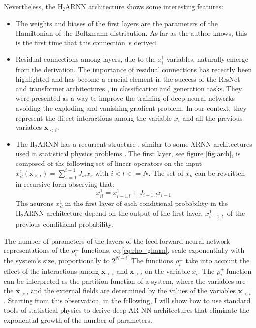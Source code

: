 \documentclass[aps,physrev,10pt,floatfix,reprint]{revtex4-2}
\begin{document}
Nevertheless, the $\text{H}_2\text{ARNN}$ architecture shows some interesting features:
\begin{itemize}
    \item 
    The weights and biases of the first layers are the parameters of the Hamiltonian of the Boltzmann distribution. 
    As far as the author knows, this is the first time that this connection is derived.
    \item Residual connections among layers, due to the $x_i^1$ variables, naturally emerge from the derivation. 
    The importance of residual connections has recently been highlighted  \cite{10.48550/arxiv.1512.03385} and has become a crucial element in the success of the ResNet and transformer architectures \cite{vaswani2017attention}, in classification and generation tasks. They were presented as a way to improve the training of deep neural networks avoiding the exploding and vanishing gradient problem. In our context, they represent the direct interactions among the variable $x_i$ and all the previous variables $\mathbf{x}_{<i}$. 

    \item The $\text{H}_2\text{ARNN}$ has a recurrent structure  \cite{bengioNatureDeepLearning2015, https://doi.org/10.48550/arxiv.1506.00019}, similar to some ARNN architectures used in statistical physics problems \cite{10.1038/s42256-021-00401-3, PhysRevResearch.2.023358}. 
    The first layer, see figure \ref{fig:arch}, is composed of the following set of linear operators on the input $x^1_{il}(\mathbf{x}_{<i})=\sum_{s=1}^{i-1} J_{si} x_s$ with $i<l<=N$. The set of $x_{il}$ can be rewritten in recursive form observing that:
    \begin{equation}
        x^1_{il} = x^1_{i-1,l} + J_{i-1,l} x_{i-1}
    \end{equation}
    The neurons $x^1_{il}$ in the first layer of each conditional probability in the $\text{H}_2\text{ARNN}$ architecture depend on the output of the first layer, $x^1_{i-1,l}$, of the previous conditional probability.
\end{itemize}
The number of parameters of the layers of the feed-forward neural network representations of the $\rho_i^{\pm}$ functions, eq.\ref{eq:rho_ghann}, scale exponentially with the system's size, proportionally to $2^{N-i}$. 
The functions $\rho_i^{\pm}$ take into account the effect of the interactions among $\mathbf{x}_{<i}$ and $\mathbf{x}_{>i}$ on the variable $x_i$. 
The $\rho_i^{\pm}$ function can be interpreted as the partition function of a system, where the variables are the $\mathbf{x}_{>i}$ and the external fields are determined by the values of the variables $\mathbf{x}_{<i}$.
Starting from this observation, in the following, I will show how to use standard tools of statistical physics to derive deep AR-NN architectures that eliminate the exponential growth of the number of parameters. 
\end{document}

